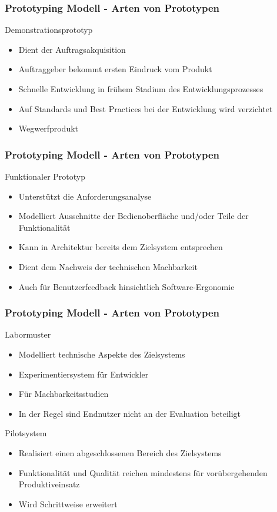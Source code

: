 \begin{frame}
\frametitle{Prototyping Modell - Arten von Prototypen}
	Demonstrationsprototyp
	\begin{itemize}
		\item Dient der Auftragsakquisition
		\item Auftraggeber bekommt ersten Eindruck vom Produkt
		\item Schnelle Entwicklung in frühem Stadium des Entwicklungsprozesses
		\item Auf Standards und Best Practices bei der Entwicklung wird verzichtet
		\item Wegwerfprodukt
	\end{itemize}
\end{frame}

\begin{frame}
\frametitle{Prototyping Modell - Arten von Prototypen}
	Funktionaler Prototyp
	\begin{itemize}
		\item Unterstützt die Anforderungsanalyse
		\item Modelliert Ausschnitte der Bedienoberfläche und/oder Teile der Funktionalität
		\item Kann in Architektur bereits dem Zielsystem entsprechen
		\item Dient dem Nachweis der technischen Machbarkeit
		\item Auch für Benutzerfeedback hinsichtlich Software-Ergonomie
	\end{itemize}
\end{frame}

\begin{frame}
\frametitle{Prototyping Modell - Arten von Prototypen}
	Labormuster
	\begin{itemize}
		\item Modelliert technische Aspekte des Zielsystems
		\item Experimentiersystem für Entwickler
		\item Für Machbarkeitsstudien
		\item In der Regel sind Endnutzer nicht an der Evaluation beteiligt
	\end{itemize}
	\bigskip
	Pilotsystem
	\begin{itemize}
		\item Realisiert einen abgeschlossenen Bereich des Zielsystems
		\item Funktionalität und Qualität reichen mindestens für vorübergehenden
		Produktiveinsatz
		\item Wird Schrittweise erweitert
	\end{itemize}
\end{frame}

